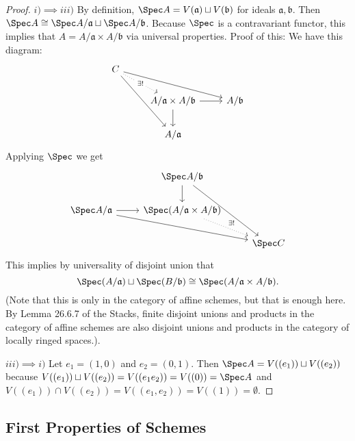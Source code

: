 \begin{proof}
	$i) \implies iii) $ By definition, $\Spec A = V(\mathfrak{a})\sqcup V(\mathfrak{b}) $ for ideals $\mathfrak{a},\mathfrak{b} $.
	Then $\Spec A \cong \Spec A / \mathfrak{a} \sqcup \Spec A / \mathfrak{b} $.
	Because $\Spec $ is a contravariant functor, this implies that $A = A / \mathfrak{a} \times A / \mathfrak{b} $ via universal properties.
	Proof of this:
	We have this diagram:
	\[\begin{tikzcd}
		C \\
	& {A / \mathfrak{a} \times A / \mathfrak{b}} & A / \mathfrak{b} \\
	& A / \mathfrak{a}
	\arrow["{\exists !}"{description}, dotted, from=1-1, to=2-2]
	\arrow[from=1-1, to=2-3]
	\arrow[from=1-1, to=3-2]
	\arrow[from=2-2, to=2-3]
	\arrow[from=2-2, to=3-2]
	\end{tikzcd}\]
	Applying $\Spec $ we get
	\[\begin{tikzcd}
		& \Spec A / \mathfrak{b} \\
		\Spec A / \mathfrak{a} & {\Spec(A / \mathfrak{a} \times A / \mathfrak{b})} \\
		&& \Spec C
		\arrow[from=1-2, to=2-2]
		\arrow[from=1-2, to=3-3]
		\arrow[from=2-1, to=2-2]
		\arrow[from=2-1, to=3-3]
		\arrow["\exists !",dotted,from=2-2, to=3-3]
	\end{tikzcd}\]
	This implies by universality of disjoint union that
	\[
		\Spec(A / \mathfrak{a}) \sqcup \Spec(B / \mathfrak{b}) \cong \Spec(A / \mathfrak{a} \times A / \mathfrak{b})
	.\] 
	(Note that this is only in the category of affine schemes, but that is enough here. By Lemma 26.6.7 of the Stacks, finite disjoint unions and products in the category of affine schemes are also disjoint unions and products in the category of locally ringed spaces.).

	$iii) \implies i) $ Let $e_{1} = (1,0)$ and $e_{2} = (0,1) $.
	Then $\Spec A = V((e_{1}))\sqcup V((e_{2})) $ because $V((e_{1}))\sqcup V((e_{2})) = V((e_{1}e_{2})) = V((0)) = \Spec A $ and $V((e_{1}))\cap V((e_{2})) = V((e_{1},e_{2})) = V((1)) = \emptyset$.
\end{proof}

\subsection{First Properties of Schemes}

